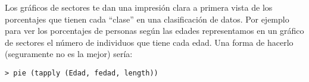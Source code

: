 Los gráficos de sectores te dan una impresión clara a primera vista de
los  porcentajes que  tienen cada  ``clase'' en  una clasificación  de
datos.  Por ejemplo  para ver  los porcentajes  de personas  según las
edades representamos en un gráfico de sectores el número de individuos
que tiene cada edad. Una forma de hacerlo (seguramente no es la mejor)
sería:


\begin{verbatim}
> pie (tapply (Edad, fedad, length))
\end{verbatim}

